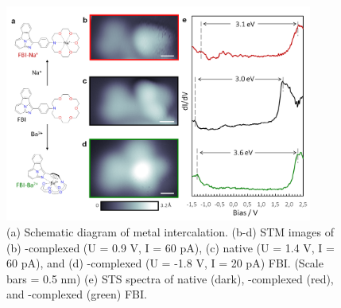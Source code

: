 \documentclass[aps,prl,reprint,longbibliography,superscriptaddress, english]{revtex4-1}
\begin{document}
\begin{figure}[ht!]
	\includegraphics[width=0.9\textwidth]{figures/Fig_STS.png}
	\caption{\label{Fig_STS} 
    (a) Schematic diagram of metal intercalation. (b-d) STM images of (b) \Nap-complexed (U = 0.9 V, I = 60 pA), (c) native (U = 1.4 V, I = 60 pA), and (d) \Bapp-complexed (U = -1.8 V, I = 20 pA) FBI. (Scale bars = 0.5 nm) (e) STS spectra of native (dark), \Nap-complexed (red), and \Bapp-complexed (green) FBI.}
\end{figure}
\end{document}
